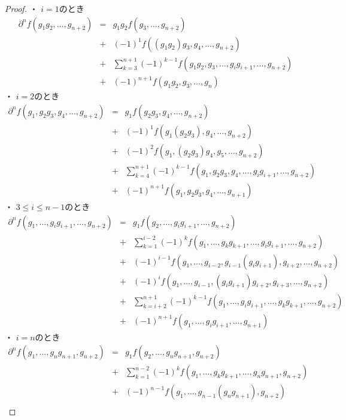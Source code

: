 \documentclass[../master_galois_theory]{subfiles}
\begin{document}
\begin{proof}
  ・ $i = 1$のとき
  \begin{eqnarray*}
    \partial^n f(g_1 g_2 , \dots ,g_{n+2}) & = & g_1 g_2 f(g_3 , \dots , g_{n+2}) \\
    & + & (-1)^1 f((g_1 g_2) g_3 , g_4 , \dots , g_{n+2}) \\
    & + & \sum_{k=3}^{n+1} (-1)^{k-1} f(g_1 g_2 , g_3 , \dots , g_i g_{i+1} , \dots , g_{n+2}) \\
    & + & (-1)^{n+1} f(g_1 g_2 , g_3 , \dots , g_n)
  \end{eqnarray*}
  ・ $i = 2$のとき
  \begin{eqnarray*}
    \partial^n f(g_1 , g_2 g_3 , g_4 , \dots , g_{n+2}) & = & g_1 f(g_2 g_3 , g_4 , \dots , g_{n+2}) \\
    & + & (-1)^1 f(g_1 (g_2 g_3) , g_4 , \dots , g_{n+2}) \\
    & + & (-1)^2 f(g_1 , (g_2 g_3) g_4 , g_5 , \dots , g_{n+2}) \\
    & + & \sum_{k=4}^{n+1} (-1)^{k-1} f(g_1 , g_2 g_3 , g_4 , \dots , g_i g_{i+1} , \dots , g_{n+2}) \\
    & + & (-1)^{n+1} f(g_1 , g_2 g_3 , g_4 , \dots , g_{n+1})
  \end{eqnarray*}
  ・ $3 \leq i \leq n-1$のとき
  \begin{eqnarray*}
    \partial^n f(g_1 , \dots , g_i g_{i+1} , \dots , g_{n+2}) & = & g_1 f(g_2 , \dots , g_i g_{i+1} , \dots , g_{n+2}) \\
    & + & \sum_{k=1}^{i-2} (-1)^k f(g_1 , \dots , g_k g_{k+1} , \dots , g_i g_{i+1} , \dots , g_{n+2}) \\
    & + & (-1)^{i-1} f(g_1 , \dots , g_{i-2} , g_{i-1} (g_i g_{i+1}) , g_{i+2} , \dots , g_{n+2}) \\
    & + & (-1)^i f(g_1 , \dots , g_{i-1} , (g_i g_{i+1}) g_{i+2} , g_{i+3} , \dots , g_{n+2}) \\
    & + & \sum_{k=i+2}^{n+1} (-1)^{k-1} f(g_1 , \dots , g_i g_{i+1} , \dots , g_k g_{k+1} , \dots , g_{n+2}) \\
    & + & (-1)^{n+1} f(g_1 , \dots , g_i g_{i+1} , \dots , g_{n+1})
  \end{eqnarray*}
  ・ $i = n$のとき
  \begin{eqnarray*}
    \partial^n f(g_1 , \dots , g_n g_{n+1} , g_{n+2}) & = & g_1 f(g_2 , \dots , g_n g_{n+1} , g_{n+2}) \\
    & + & \sum_{k=1}^{n-2} (-1)^k f(g_1 , \dots , g_k g_{k+1} , \dots , g_n g_{n+1} , g_{n+2}) \\
    & + & (-1)^{n-1} f(g_1 , \dots , g_{n-1} (g_n g_{n+1}) , g_{n+2}) \\

\end{eqnarray*}
\end{proof}
\end{document}
